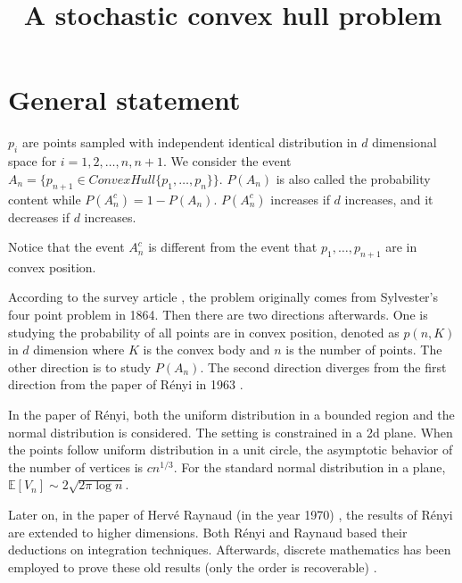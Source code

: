 \documentclass{article}
\title{A stochastic convex hull problem}
\def\E{\mathbb{E}}
\begin{document}
\maketitle
\section{General statement}
$p_i$ are points sampled with independent identical distribution in $d$ dimensional space
for $i=1,2,\dots, n, n+1$. We consider the event
$A_n =\{p_{n+1} \in ConvexHull\{p_1,
\dots, p_n\} \}$. $P(A_n)$ is also called
the probability content while $P(A_n^c)
=1-P(A_n)$.
$P(A_n^c)$ increases if $d$ increases,
and it decreases if $d$ increases.

Notice that the event $A^c_n$ is different
from the event that $p_1, \dots, p_{n+1}$
are in convex position.

According to the survey article
\cite{barany2008random},
the problem originally comes from Sylvester's four point problem
in 1864. Then there are two directions afterwards.
One is studying the probability of all points are in convex
position, denoted as $p(n, K)$ in $d$ dimension where $K$ is the convex body
and $n$ is the number of points.
The other direction is to study $P(A_n)$.
The second direction diverges from the first direction
from the paper of Rényi in 1963 \cite{renyi1963konvexe}.

In the paper of Rényi, both the uniform distribution in a bounded region
and the normal distribution is considered.
The setting is constrained in a 2d plane.
When the points follow uniform distribution
in a unit circle, the asymptotic behavior
of the number of vertices is $cn^{1/3}$.
For the standard normal distribution in a plane,
$\E[V_n] \sim 2\sqrt{2\pi \log n}$.

Later on, in the paper of Hervé Raynaud (in the year 1970)
\cite{raynaud1970enveloppe},
the results
of Rényi are extended to higher dimensions.
Both Rényi and Raynaud
based their deductions on integration techniques.
Afterwards, discrete mathematics has been
employed to prove these old results (only the order
is recoverable) \cite{har2011expected}.
\end{document}

